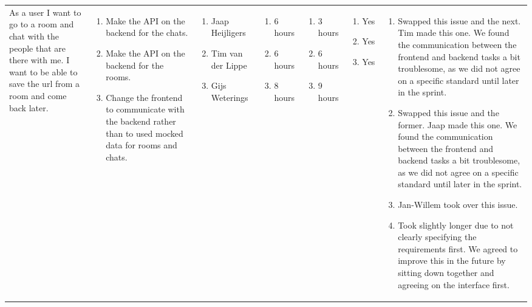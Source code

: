\documentclass[11pt,a4paper,landscape]{article}
\begin{document}
\begin{table}[h]
\begin{tabular}{|p{3cm}|p{5.0cm}|p{3.0cm}|p{2.2cm}|p{2.2cm}|p{2.0cm}|p{5cm}}
As a user I want to go to a room and chat with the people that are there with me.
I want to be able to save the url from a room and come back later.
&
\begin{enumerate}
\item Make the API on the backend for the chats.
\item Make the API on the backend for the rooms.
\item Change the frontend to communicate with the backend rather than to used mocked data for rooms and chats.
\end{enumerate}

&

\begin{enumerate}
\item Jaap Heijligers
\item Tim van der Lippe
\item Gijs Weterings
\end{enumerate}

&
\begin{enumerate}
\item 6 hours
\item 6 hours
\item 8 hours
\end{enumerate}

&
\begin{enumerate}
\item 3 hours
\item 6 hours
\item 9 hours
\end{enumerate}

&
\begin{enumerate}
\item Yes
\item Yes
\item Yes
\end{enumerate}
&
\begin{enumerate}
\item Swapped this issue and the next. Tim made this one. We found the communication between the frontend and backend tasks a bit troublesome, as we did not agree on a specific standard until later in the sprint.
\item Swapped this issue and the former. Jaap made this one. We found the communication between the frontend and backend tasks a bit troublesome, as we did not agree on a specific standard until later in the sprint.
\item Jan-Willem took over this issue.
\item Took slightly longer due to not clearly specifying the requirements first. We agreed to improve this in the future by sitting down together and agreeing on the interface first.
\end{enumerate}

\end{tabular}
\end{table}
\end{document}
